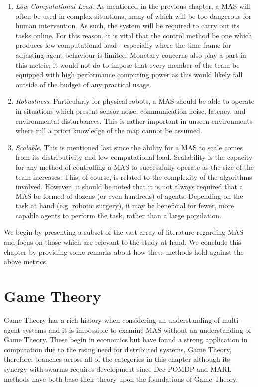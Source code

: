 \documentclass[.../main.tex]{subfiles}
\begin{document}
\begin{enumerate}
\item {\em Low Computational Load}. As mentioned in the previous chapter, a
  MAS will often be used in complex situations, many of which will be
  too dangerous for human intervention. As such, the system will be
  required to carry out its tasks online. For this reason, it is vital
  that the control method be one which produces low computational load
  - especially where the time frame for adjusting agent behaviour is
  limited. Monetary concerns also play a part in this metric; it would
  not do to impose that every member of the team be equipped with high
  performance computing power as this would likely fall outside of the
  budget of any practical usage.
  
    \item {\em Robustness}. Particularly for physical robots, a MAS
      should be able to operate in situations which present sensor
      noise, communication noise, latency, and environmental
      disturbances. This is rather important in unseen environments
      where full a priori knowledge of the map cannot be assumed.
    
    \item {\em Scalable}. This is mentioned last since the ability for
      a MAS to scale comes from its distributivity and low
      computational load. Scalability is the capacity for any method
      of controlling a MAS to successfully operate as the size of the
      team increases. This, of course, is related to the complexity of
      the algorithms involved. However, it should be noted that it is
      not always required that a MAS be formed of dozens (or even
      hundreds) of agents. Depending on the task at hand (e.g. robotic
      surgery), it may be beneficial for fewer, more capable agents to
      perform the task, rather than a large population.
\end{enumerate}

We begin by presenting a subset of the vast array of literature regarding MAS and focus on those
which are relevant to the study at hand. We conclude this chapter by providing some remarks about
how these methods hold against the above metrics.

\section{Game Theory} \label{sec::Game_Theory}

Game Theory has a rich history when considering an understanding of
multi-agent systems and it is impossible to examine MAS without an
understanding of Game Theory. These begin in economics but have found
a strong application in computation due to the rising need for
distributed systems. Game Theory, therefore, branches across all of
the categories in this chapter although its synergy with swarms
requires development since Dec-POMDP  and MARL methods have both base
their theory upon the foundations of Game Theory.
\end{document}
